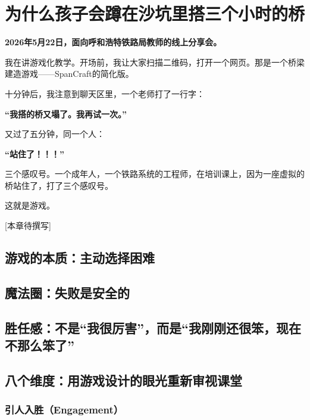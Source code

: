 
\chapter{为什么孩子会蹲在沙坑里搭三个小时的桥}

\begin{classroom-scene}
\noindent \textbf{2026年5月22日，面向呼和浩特铁路局教师的线上分享会。}

\vspace{0.3cm}

\noindent 我在讲游戏化教学。开场前，我让大家扫描二维码，打开一个网页。那是一个桥梁建造游戏——SpanCraft的简化版。

\noindent 十分钟后，我注意到聊天区里，一个老师打了一行字：

\noindent\textbf{“我搭的桥又塌了。我再试一次。”}

\noindent 又过了五分钟，同一个人：

\noindent\textbf{“站住了！！！”}

\noindent 三个感叹号。一个成年人，一个铁路系统的工程师，在培训课上，因为一座虚拟的桥站住了，打了三个感叹号。

\noindent 这就是游戏。
\end{classroom-scene}

{\small\color{muted} [本章待撰写]}

\section{游戏的本质：主动选择困难}

\section{魔法圈：失败是安全的}

\section{胜任感：不是“我很厉害”，而是“我刚刚还很笨，现在不那么笨了”}

\section{八个维度：用游戏设计的眼光重新审视课堂}

\subsection{引人入胜（Engagement）}

